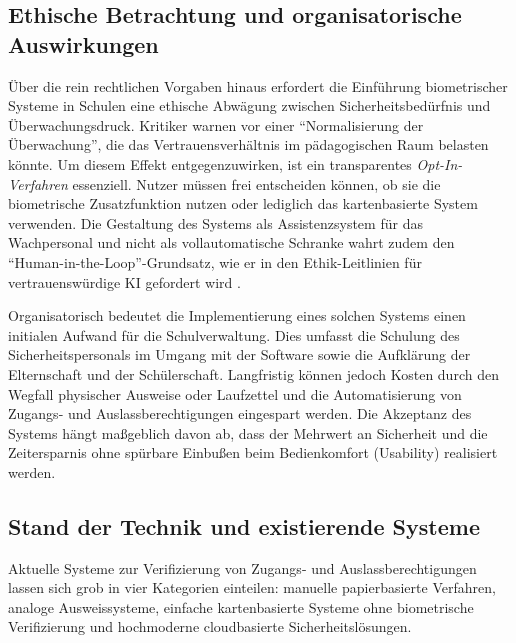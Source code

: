\subsection{Ethische Betrachtung und organisatorische Auswirkungen} \label{subsec:ethik}
Über die rein rechtlichen Vorgaben hinaus erfordert die Einführung biometrischer Systeme in Schulen eine ethische Abwägung zwischen Sicherheitsbedürfnis und Überwachungsdruck. Kritiker warnen vor einer \enquote{Normalisierung der Überwachung}, die das Vertrauensverhältnis im pädagogischen Raum belasten könnte. Um diesem Effekt entgegenzuwirken, ist ein transparentes \textit{Opt-In-Verfahren} essenziell. Nutzer müssen frei entscheiden können, ob sie die biometrische Zusatzfunktion nutzen oder lediglich das kartenbasierte System verwenden. Die Gestaltung des Systems als Assistenzsystem für das Wachpersonal und nicht als vollautomatische Schranke wahrt zudem den \enquote{Human-in-the-Loop}-Grundsatz, wie er in den Ethik-Leitlinien für vertrauenswürdige KI gefordert wird \autocite{aiethics2019}.

Organisatorisch bedeutet die Implementierung eines solchen Systems einen initialen Aufwand für die Schulverwaltung. Dies umfasst die Schulung des Sicherheitspersonals im Umgang mit der Software sowie die Aufklärung der Elternschaft und der Schülerschaft. Langfristig können jedoch Kosten durch den Wegfall physischer Ausweise oder Laufzettel und die Automatisierung von Zugangs- und Auslassberechtigungen eingespart werden. Die Akzeptanz des Systems hängt maßgeblich davon ab, dass der Mehrwert an Sicherheit und die Zeitersparnis ohne spürbare Einbußen beim Bedienkomfort (Usability) realisiert werden.


\subsection{Stand der Technik und existierende Systeme} \label{subsec:standdertechnik}
Aktuelle Systeme zur Verifizierung von Zugangs- und Auslassberechtigungen lassen sich grob in vier Kategorien einteilen: manuelle papierbasierte Verfahren, analoge Ausweissysteme, einfache kartenbasierte Systeme ohne biometrische Verifizierung und hochmoderne cloudbasierte Sicherheitslösungen. 


